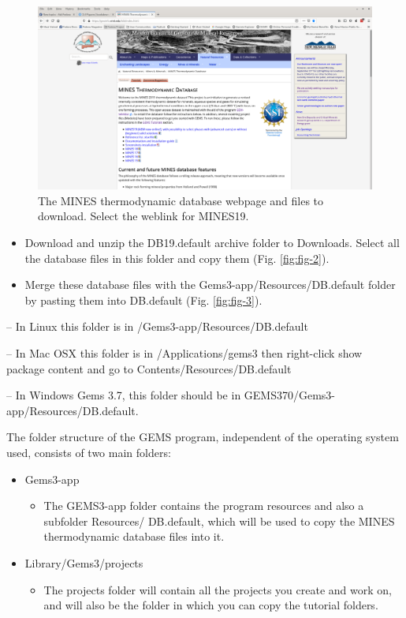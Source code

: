 \documentclass[
]{book}
\providecommand{\tightlist}{%
  \setlength{\itemsep}{0pt}\setlength{\parskip}{0pt}}
\begin{document}
\begin{figure}
\includegraphics[width=0.9\linewidth]{figures/module1/fig-1} \caption{The MINES thermodynamic database webpage and files to download. Select the weblink for MINES19.}\label{fig:fig-1}
\end{figure}

\begin{itemize}
\item
  Download and unzip the DB19.default archive folder to Downloads. Select all the database files in this folder and copy them (Fig. \ref{fig:fig-2}).
\item
  Merge these database files with the Gems3-app/Resources/DB.default folder by pasting them into DB.default (Fig. \ref{fig:fig-3}).
\end{itemize}

-- In Linux this folder is in /Gems3-app/Resources/DB.default

-- In Mac OSX this folder is in /Applications/gems3 then right-click show package content and go to Contents/Resources/DB.default

-- In Windows Gems 3.7, this folder should be in GEMS370/Gems3-app/Resources/DB.default.

The folder structure of the GEMS program, independent of the operating system used, consists of two main folders:

\begin{itemize}
\tightlist
\item
  Gems3-app

  \begin{itemize}
  \tightlist
  \item
    The GEMS3-app folder contains the program resources and also a subfolder Resources/ DB.default, which will be used to copy the MINES thermodynamic database files into it.
  \end{itemize}
\item
  Library/Gems3/projects

  \begin{itemize}
  \tightlist
  \item
    The projects folder will contain all the projects you create and work on, and will also be the folder in which you can copy the tutorial folders.
  \end{itemize}
\end{itemize}
\end{document}
